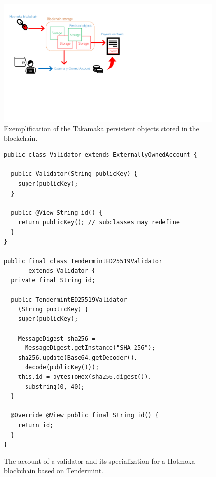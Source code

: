 \begin{figure}[ht]
\centering
\includegraphics[width=\linewidth]{figures/takamaka_payable_contract}
\caption{Exemplification of the Takamaka persistent objects stored in the blockchain.}
\label{figure.takamaka_payable_contract}
\end{figure}

\begin{figure}[th]
  \begin{center}
    \begin{lstlisting}[language=Takamaka]
public class Validator extends ExternallyOwnedAccount {

  public Validator(String publicKey) {
    super(publicKey);
  }

  public @View String id() {
    return publicKey(); // subclasses may redefine
  }
}

public final class TendermintED25519Validator 
       extends Validator {
  private final String id;

  public TendermintED25519Validator
    (String publicKey) {
    super(publicKey);

    MessageDigest sha256 = 
      MessageDigest.getInstance("SHA-256");
    sha256.update(Base64.getDecoder().
      decode(publicKey()));
    this.id = bytesToHex(sha256.digest()).
      substring(0, 40);
  }

  @Override @View public final String id() {
    return id;
  }
}
    \end{lstlisting}
  \end{center}
  \caption{The account of a validator and its specialization for a Hotmoka blockchain based on Tendermint.}\label{fig:validator}
\end{figure}


